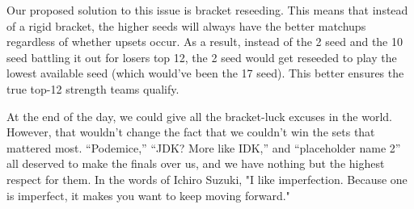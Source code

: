 \medskip

Our proposed solution to this issue is bracket reseeding. This means that instead of a rigid bracket, the higher seeds will always have the better matchups regardless of whether upsets occur. As a result, instead of the 2 seed and the 10 seed battling it out for losers top 12, the 2 seed would get reseeded to play the lowest available seed (which would've been the 17 seed). This better ensures the true top-12 strength teams qualify.

\medskip

At the end of the day, we could give all the bracket-luck excuses in the world. However, that wouldn't change the fact that we couldn't win the sets that mattered most. ``Podemice,'' ``JDK? More like IDK,'' and ``placeholder name 2'' all deserved to make the finals over us, and we have nothing but the highest respect for them. In the words of Ichiro Suzuki, "I like imperfection. Because one is imperfect, it makes you want to keep moving forward."